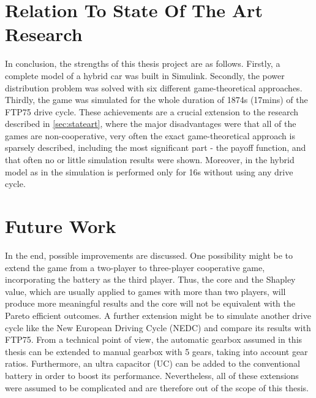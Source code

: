 \section{Relation To State Of The Art Research}
In conclusion, the strengths of this thesis project are as follows. Firstly, a complete model of a hybrid car was built in Simulink. Secondly, the power distribution problem was solved with six different game-theoretical approaches. Thirdly, the game was simulated for the whole duration of 1874s (17mins) of the FTP75 drive cycle. These achievements are a crucial extension to the research described in \ref{sec:stateart}, where the major disadvantages were that all of the games are non-cooperative, very often the exact game-theoretical approach is sparsely described, including the most significant part - the payoff function, and that often no or little simulation results were shown. Moreover, in the hybrid model as in \citet{hevMatlab} the simulation is performed only for 16s without using any drive cycle.

\section{Future Work}
In the end, possible improvements are discussed. One possibility might be to extend the game from a two-player to three-player cooperative game, incorporating the battery as the third player. Thus, the core and the Shapley value, which are usually applied to games with more than two players, will produce more meaningful results and the core will not be equivalent with the Pareto efficient outcomes. A further extension might be to simulate another drive cycle like the New European Driving Cycle (NEDC) and compare its results with FTP75. From a technical point of view, the automatic gearbox assumed in this thesis can be extended to manual gearbox with 5 gears, taking into account gear ratios. Furthermore, an ultra capacitor (UC) can be added to the conventional battery in order to boost its performance. Nevertheless, all of these extensions were assumed to be complicated and are therefore out of the scope of this thesis.

